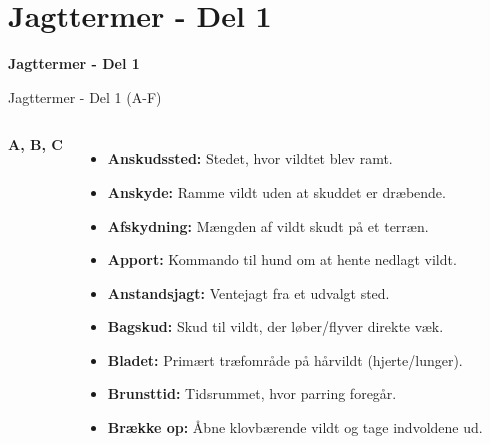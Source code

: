 \section{Jagttermer - Del 1}

\begin{frame}
  \vspace{3em}
  \begin{center}
    {\LARGE \textbf{Jagttermer - Del 1}
    }
    \\
    \vspace{1em}
  \end{center}
\end{frame}


\begin{frame}{Jagttermer - Del 1 (A-F)}

\vspace{0.3em} %

\begin{columns}[T]
    \textbf{\large A, B, C}
    \setlength{\parskip}{0.1em} %
    \scriptsize %
    \RaggedRight
    \begin{itemize}
        \item \textbf{Anskudssted:} Stedet, hvor vildtet blev ramt.
        \item \textbf{Anskyde:} Ramme vildt uden at skuddet er dræbende.
        \item \textbf{Afskydning:} Mængden af vildt skudt på et terræn.
        \item \textbf{Apport:} Kommando til hund om at hente nedlagt vildt.
        \item \textbf{Anstandsjagt:} Ventejagt fra et udvalgt sted.
        \item \textbf{Bagskud:} Skud til vildt, der løber/flyver direkte væk.
        \item \textbf{Bladet:} Primært træfområde på hårvildt (hjerte/lunger).
        \item \textbf{Brunsttid:} Tidsrummet, hvor parring foregår.
        \item \textbf{Brække op:} Åbne klovbærende vildt og tage indvoldene ud.
    \end{itemize}


\end{columns}
\end{frame}
